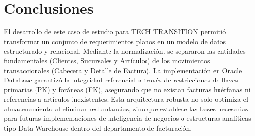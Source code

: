 \section{Conclusiones}
El desarrollo de este caso de estudio para TECH TRANSITION permitió transformar un conjunto de requerimientos planos en un modelo de datos estructurado y relacional. Mediante la normalización, se separaron las entidades fundamentales (Clientes, Sucursales y Artículos) de los movimientos transaccionales (Cabecera y Detalle de Factura). La implementación en Oracle Database garantizó la integridad referencial a través de restricciones de llaves primarias (PK) y foráneas (FK), asegurando que no existan facturas huérfanas ni referencias a artículos inexistentes. Esta arquitectura robusta no solo optimiza el almacenamiento al eliminar redundancias, sino que establece las bases necesarias para futuras implementaciones de inteligencia de negocios o estructuras analíticas tipo Data Warehouse dentro del departamento de facturación.